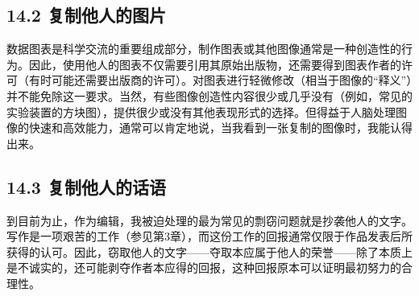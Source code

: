 \subsection*{14.2 复制他人的图片}
数据图表是科学交流的重要组成部分，制作图表或其他图像通常是一种创造性的行为。因此，使用他人的图表不仅需要引用其原始出版物，还需要得到图表作者的许可（有时可能还需要出版商的许可）。对图表进行轻微修改（相当于图像的“释义”）并不能免除这一要求。当然，有些图像创造性内容很少或几乎没有（例如，常见的实验装置的方块图），提供很少或没有其他表现形式的选择。但得益于人脑处理图像的快速和高效能力，通常可以肯定地说，当我看到一张复制的图像时，我能认得出来。

\subsection*{14.3 复制他人的话语}
到目前为止，作为编辑，我被迫处理的最为常见的剽窃问题就是抄袭他人的文字。写作是一项艰苦的工作（参见第3章），而这份工作的回报通常仅限于作品发表后所获得的认可。因此，窃取他人的文字——夺取本应属于他人的荣誉——除了本质上是不诚实的，还可能剥夺作者本应得的回报，这种回报原本可以证明最初努力的合理性。

